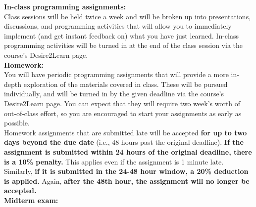 \documentclass[oneside,letterpaper,11pt]{exam}
\begin{document}
{\noindent \textbf{In-class programming assignments:}}\\[-5pt]

{\noindent Class sessions will be held twice a week and will be broken up into presentations, discussions, and programming activities that will allow you to immediately implement (and get instant feedback on) what you have just learned. In-class programming activities will be turned in at the end of the class session via the course's Desire2Learn page.}\\




{\noindent \textbf{Homework:}}\\[-5pt]


{\noindent You will have periodic programming assignments that will provide a more in-depth exploration of the materials covered in class. These will be pursued individually, and will be turned in by the given deadline via the course's Desire2Learn page. You can expect that they will require two week's worth of out-of-class effort, so you are encouraged to start your assignments as early as possible.
}\\[-5pt]

{\noindent Homework assignments that are submitted late will be accepted \textbf{for up to two days beyond the due date} (i.e., 48 hours past the original deadline). \textbf{If the assignment is submitted within 24 hours of the original deadline, there is a 10\% penalty.} This applies even if the assignment is 1 minute late. Similarly, \textbf{if it is submitted in the 24-48 hour window, a 20\% deduction is applied.} Again, \textbf{after the 48th hour, the assignment will no longer be accepted.}}\\

{\noindent \textbf{Midterm exam:}}\\[-5pt]
\end{document}
